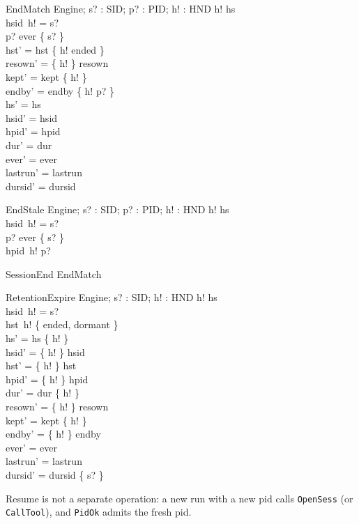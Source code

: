 \documentclass[a4paper,10pt,fleqn]{article}
\begin{document}
\begin{schema}{EndMatch}
  \Delta Engine; s? : SID; p? : PID; h! : HND
\where
  h! \in hs \\
  hsid~h! = s? \\
  p? \in ever \limg \{ s? \} \rimg \\
  hst' = hst \oplus \{ h! \mapsto ended \} \\
  resown' = \{ h! \} \ndres resown \\
  kept' = kept \setminus \{ h! \} \\
  endby' = endby \oplus \{ h! \mapsto p? \} \\
  hs' = hs \\
  hsid' = hsid \\
  hpid' = hpid \\
  dur' = dur \\
  ever' = ever \\
  lastrun' = lastrun \\
  dursid' = dursid
\end{schema}

\begin{schema}{EndStale}
  \Xi Engine; s? : SID; p? : PID; h! : HND
\where
  h! \in hs \\
  hsid~h! = s? \\
  p? \in ever \limg \{ s? \} \rimg \\
  hpid~h! \neq p?
\end{schema}

\begin{zed}
  SessionEnd  EndMatch
\end{zed}

\begin{schema}{RetentionExpire}
  \Delta Engine; s? : SID; h! : HND
\where
  h! \in hs \\
  hsid~h! = s? \\
  hst~h! \in \{ ended, dormant \} \\
  hs' = hs \setminus \{ h! \} \\
  hsid' = \{ h! \} \ndres hsid \\
  hst' = \{ h! \} \ndres hst \\
  hpid' = \{ h! \} \ndres hpid \\
  dur' = dur \setminus \{ h! \} \\
  resown' = \{ h! \} \ndres resown \\
  kept' = kept \setminus \{ h! \} \\
  endby' = \{ h! \} \ndres endby \\
  ever' = ever \\
  lastrun' = lastrun \\
  dursid' = dursid \setminus \{ s? \}
\end{schema}

Resume is not a separate operation: a new run with a new pid calls
\texttt{OpenSess} (or \texttt{CallTool}), and \texttt{PidOk} admits the fresh
pid.
\end{document}
